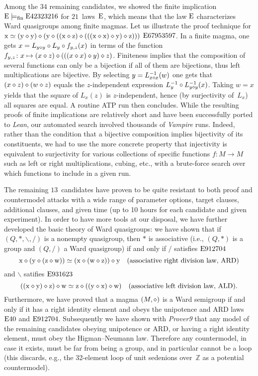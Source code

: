 Among the $34$ remaining candidates, we showed the finite implication $\mathrm{E}\models_{\mathrm{fin}}\mathrm{E}42323216$ for $21$~laws~$\mathrm{E}$, which means that the law $\mathrm{E}$ characterizes Ward quasigroups among finite magmas.  Let us illustrate the proof technique for $\mathrm{x} \simeq (\mathrm{y} \diamond \mathrm{y}) \diamond (\mathrm{y} \diamond ((\mathrm{x} \diamond \mathrm{z}) \diamond (((\mathrm{x} \diamond \mathrm{x}) \diamond \mathrm{y}) \diamond \mathrm{z})))$ $\mathrm{E}67953597$.  In a finite magma, one gets $x = L_{y\diamond y} \circ L_y \circ f_{y,z}(x)$ in terms of the function $f_{y,z}\colon x \mapsto (x\diamond z) \diamond (((x \diamond x) \diamond y) \diamond z)$.  Finiteness implies that the composition of several functions can only be a bijection if all of them are bijections, thus left multiplications are bijective.  By selecting $y=L_{x\diamond x}^{-1}(w)$ one gets that $(x\diamond z)\diamond (w\diamond z)$ equals the $z$-independent expression $L_y^{-1} \circ L_{y\diamond y}^{-1}(x)$.  Taking $w=x$ yields that the square of $L_x(z)$ is $z$-independent, hence (by surjectivity of~$L_x$) all squares are equal.  A routine ATP run then concludes.
While the resulting proofs of finite implications are relatively short and have been successfully ported to \emph{Lean}, our automated search involved thousands of \emph{Vampire} runs.
Indeed, rather than the condition that a bijective composition implies bijectivity of its constituents, we had to use the more concrete property that injectivity is equivalent to surjectivity for various collections of specific functions $f\colon M\to M$ such as left or right multiplications, cubing, etc.\@, with a brute-force search over which functions to include in a given run.

The remaining $13$~candidates have proven to be quite resistant to both proof and countermodel attacks with a wide range of parameter options, target clauses, additional clauses, and given time (up to 10 hours for each candidate and given experiment). In order to have more tools at our disposal, we have further developed the basic theory of Ward quasigroups: we have shown that if $(Q,*,\backslash,/)$ is a nonempty quasigroup, then $*$ is associative (i.e., $(Q,*)$ is a group and $(Q,/)$ a Ward quasigroup) if and only if $/$ satisfies $\mathrm{E}912704$
\[\mathrm{x}\diamond(\mathrm{y}\diamond(\mathrm{z}\diamond\mathrm{w})) \simeq(\mathrm{x}\diamond(\mathrm{w}\diamond\mathrm{z}))\diamond\mathrm{y} \quad \text{(associative right division law, ARD)}\]
and $\backslash$ satifies $\mathrm{E}931623$
\[((\mathrm{x}\diamond\mathrm{y})\diamond\mathrm{z})\diamond\mathrm{w}\simeq\mathrm{z}\diamond((\mathrm{y}\diamond\mathrm{x})\diamond\mathrm{w}) \quad \text{(associative left division law, ALD)}.\]
Furthermore, we have proved that a magma $(M,\diamond)$ is a Ward semigroup if and only if it has a right identity element and obeys the unipotence and ARD laws $\mathrm{E}40$ and $\mathrm{E}912704$. Subsequently we have shown with \emph{Prover9} that any model of the remaining candidates obeying unipotence or ARD, or having a right identity element, must obey the Higman--Neumann law. Therefore any countermodel, in case it exists, must be far from being a group, and in particular cannot be a loop (this discards, e.g., the 32-element loop of unit sedenions over~$\mathbb{Z}$ as a potential countermodel).



